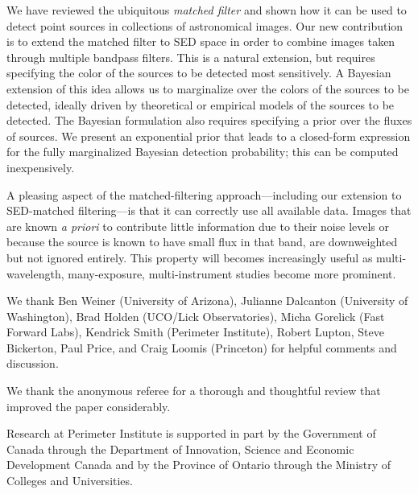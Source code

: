 \documentclass[11pt,letterpaper,linenumbers]{aastex63}
\newcommand{\chipos}{\chi_+}
\begin{document}
We have reviewed the ubiquitous \emph{matched filter} and shown how it
can be used to detect point sources in collections of astronomical
images.  Our new contribution is to extend the matched filter to SED
space in order to combine images taken through multiple bandpass
filters.  This is a natural extension, but requires specifying the
color of the sources to be detected most sensitively.  A Bayesian
extension of this idea allows us to marginalize over the colors of the
sources to be detected, ideally driven by theoretical or empirical
models of the sources to be detected.  The Bayesian formulation also
requires specifying a prior over the fluxes of sources.  We present an
exponential prior that leads to a closed-form expression for the fully
marginalized Bayesian detection probability; this can be computed
inexpensively.


A pleasing aspect of the matched-filtering approach---including our
extension to SED-matched filtering---is that it can correctly use all
available data.  Images that are known \emph{a priori} to contribute
little information due to their noise levels or because the source is
known to have small flux in that band, are downweighted but not
ignored entirely.  This property will becomes increasingly useful as
multi-wavelength, many-exposure, multi-instrument studies become more
prominent.




\acknowledgments

We thank
Ben Weiner (University of Arizona),
Julianne Dalcanton (University of Washington),
Brad Holden (UCO/Lick Observatories),
Micha Gorelick (Fast Forward Labs),
Kendrick Smith (Perimeter Institute),
Robert Lupton, Steve Bickerton, Paul Price, and Craig Loomis (Princeton)
for helpful comments and discussion.

We thank the anonymous referee for a thorough and thoughtful review
that improved the paper considerably.

Research at Perimeter Institute is supported in part by the Government
of Canada through the Department of Innovation, Science and Economic
Development Canada and by the Province of Ontario through the Ministry
of Colleges and Universities.
\end{document}
